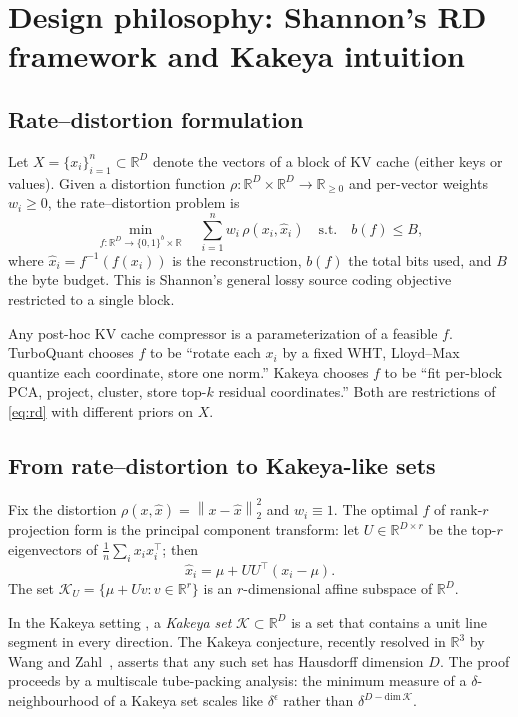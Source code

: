 \documentclass[11pt,a4paper]{article}
\theoremstyle{definition}
\theoremstyle{plain}
\newcommand{\R}{\mathbb{R}}
\newcommand{\norm}[1]{\left\lVert#1\right\rVert}
\begin{document}
\section{Design philosophy: Shannon's RD framework and Kakeya intuition}
\label{sec:framework}

\subsection{Rate--distortion formulation}
Let $X = \{x_i\}_{i=1}^n \subset \R^D$ denote the vectors of a block of KV cache (either keys or values). Given a distortion function $\rho: \R^D \times \R^D \to \R_{\geq 0}$ and per-vector weights $w_i \geq 0$, the rate--distortion problem is
\begin{equation}
\label{eq:rd}
\min_{f: \R^D \to \{0,1\}^b \times \R} \quad \sum_{i=1}^n w_i \, \rho(x_i, \hat{x}_i)
\quad \text{s.t.} \quad b(f) \leq B,
\end{equation}
where $\hat{x}_i = f^{-1}(f(x_i))$ is the reconstruction, $b(f)$ the total bits used, and $B$ the byte budget. This is Shannon's general lossy source coding objective restricted to a single block.

Any post-hoc KV cache compressor is a parameterization of a feasible $f$. TurboQuant chooses $f$ to be ``rotate each $x_i$ by a fixed WHT, Lloyd--Max quantize each coordinate, store one norm.'' Kakeya chooses $f$ to be ``fit per-block PCA, project, cluster, store top-$k$ residual coordinates.'' Both are restrictions of \eqref{eq:rd} with different priors on $X$.

\subsection{From rate--distortion to Kakeya-like sets}
Fix the distortion $\rho(x, \hat{x}) = \norm{x - \hat{x}}_2^2$ and $w_i \equiv 1$. The optimal $f$ of rank-$r$ projection form is the principal component transform: let $U \in \R^{D \times r}$ be the top-$r$ eigenvectors of $\tfrac{1}{n}\sum_i x_i x_i^\top$; then
\begin{equation}
\label{eq:pca-skeleton}
\hat{x}_i = \mu + U U^\top (x_i - \mu).
\end{equation}
The set $\mathcal{K}_U = \{\mu + U v : v \in \R^r\}$ is an $r$-dimensional affine subspace of $\R^D$.

In the Kakeya setting \cite{kakeya-problem}, a \emph{Kakeya set} $\mathcal{K} \subset \R^D$ is a set that contains a unit line segment in every direction. The Kakeya conjecture, recently resolved in $\R^3$ by Wang and Zahl~\cite{wang-zahl}, asserts that any such set has Hausdorff dimension $D$. The proof proceeds by a multiscale tube-packing analysis: the minimum measure of a $\delta$-neighbourhood of a Kakeya set scales like $\delta^{\epsilon}$ rather than $\delta^{D - \text{dim}\,\mathcal{K}}$.
\end{document}
